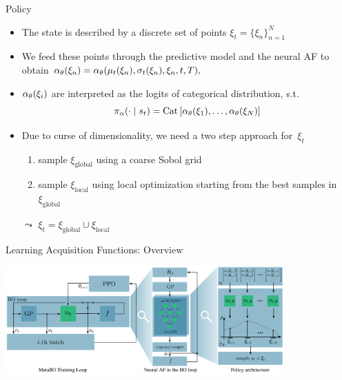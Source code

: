 \begin{frame}[c]{Policy }

\begin{itemize}
\item The state is described by a discrete set of points $\xi_t = \{\xi_n\}^N_{n=1}$
\pause
\item We feed these points through the predictive model and the neural AF to obtain $\alpha_\theta(\xi_n) = \alpha_\theta(\mu_t(\xi_n), \sigma_t(\xi_n), \xi_n, t, T),  $
\pause
\item $\alpha_\theta(\xi_i)$ are interpreted as the logits of categorical distribution, s.t.
$$\pi_\alpha(\cdot \mid s_t) = \text{Cat}\left[\alpha_\theta(\xi_1), \ldots, \alpha_\theta(\xi_N) \right] $$
\pause
\item Due to curse of dimensionality, we need a two step approach for~$\xi_t$
\begin{enumerate}
\item sample $\xi_{\text{global}}$ using a coarse Sobol grid
\item sample $\xi_{\text{local}}$ using local optimization starting from the best samples in $\xi_{\text{global}}$
\end{enumerate}
\item[$\leadsto$] $\xi_t = \xi_{\text{global}} \cup \xi_{\text{local}}$ 
\end{itemize}

\end{frame}
\begin{frame}[c,fragile]{Learning Acquisition Functions: Overview }

\centering
\includegraphics[width=0.8\textwidth]{images/l2acq.png}


\end{frame}
